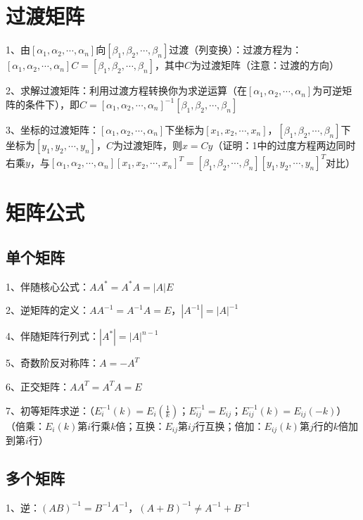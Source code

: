 \section{过渡矩阵}

1、由$[\alpha_1,\alpha_2,\cdots,\alpha_n]$向$[\beta_1,\beta_2,\cdots,\beta_n]$过渡（列变换）：过渡方程为：$[\alpha_1,\alpha_2,\cdots,\alpha_n]C=[\beta_1,\beta_2,\cdots,\beta_n]$，其中$C$为过渡矩阵（注意：过渡的方向）

2、求解过渡矩阵：利用过渡方程转换你为求逆运算（在$[\alpha_1,\alpha_2,\cdots,\alpha_n]$为可逆矩阵的条件下），即$C=[\alpha_1,\alpha_2,\cdots,\alpha_n]^{-1}[\beta_1,\beta_2,\cdots,\beta_n]$

3、坐标的过渡矩阵：$[\alpha_1,\alpha_2,\cdots,\alpha_n]$下坐标为$[x_1,x_2,\cdots,x_n]$，$[\beta_1,\beta_2,\cdots,\beta_n]$下坐标为$[y_1,y_2,\cdots,y_n]$，$C$为过渡矩阵，则$x=Cy$（证明：1中的过度方程两边同时右乘$y$，与$[\alpha_1,\alpha_2,\cdots,\alpha_n][x_1,x_2,\cdots,x_n]^T=[\beta_1,\beta_2,\cdots,\beta_n][y_1,y_2,\cdots,y_n]^T$对比）

\section{矩阵公式}



\subsection{单个矩阵}

1、伴随核心公式：$AA^*=A^*A=|A|E$

2、逆矩阵的定义：$AA^{-1}=A^{-1}A=E$，$|A^{-1}|=|A|^{-1}$

4、伴随矩阵行列式：$|A^*|=|A|^{n-1}$

5、奇数阶反对称阵：$A=-A^T$

6、正交矩阵：$AA^T=A^TA=E$

7、初等矩阵求逆：（$E_{i}^{-1}(k)=E_{i}(\frac 1 k)$；$E_{ij}^{-1}=E_{ij}$；$E_{ij}^{-1}(k)=E_{ij}(-k)$）（倍乘：$E_{i}(k)$第$i$行乘$k$倍；互换：$E_{ij}$第$ij$行互换；倍加：$E_{ij}(k)$第$j$行的$k$倍加到第$i$行）



\subsection{多个矩阵}

1、逆：$(AB)^{-1}=B^{-1} A^{-1}$，$(A+B)^{-1}\ne A^{-1} + B^{-1}$

